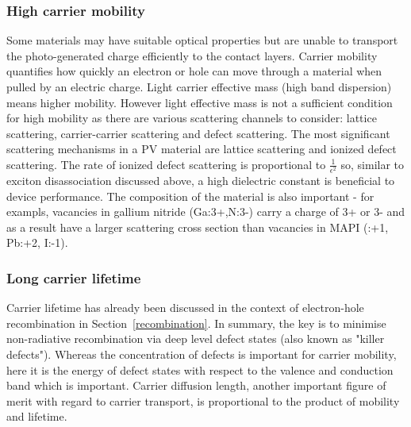 \subsubsection{High carrier mobility}
Some materials may have suitable optical properties but are unable to transport the photo-generated charge efficiently to the contact layers. Carrier mobility quantifies how quickly an electron or hole can move through a material when pulled by an electric charge. 
Light carrier effective mass (high band dispersion) means higher mobility. However light effective mass is not a sufficient condition for high mobility as there are various scattering channels to consider: lattice scattering, carrier-carrier scattering and defect scattering. The most significant scattering mechanisms in a PV material are lattice scattering and ionized defect scattering.
The rate of ionized defect scattering is proportional to $\frac{1}{\epsilon^2}$ so, similar to exciton disassociation discussed above, a high dielectric constant is beneficial to device performance. The composition of the material is also important - for exampls, vacancies in gallium nitride (Ga:3+,N:3-) carry a charge of 3+ or 3- and as a result have a larger scattering cross section than vacancies in MAPI (:+1, Pb:+2, I:-1).

\subsubsection{Long carrier lifetime}
Carrier lifetime has already been discussed in the context of electron-hole recombination in Section\ \ref{recombination}. In summary, the key is to minimise non-radiative recombination via deep level defect states (also known as "killer defects"). Whereas the concentration of defects is important for carrier mobility, here it is the energy of defect states with respect to the valence and conduction band which is important. Carrier diffusion length, another important figure of merit with regard to carrier transport, is proportional to the product of mobility and lifetime.

